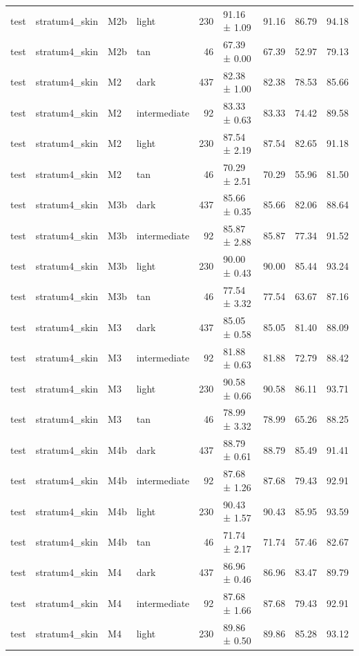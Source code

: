 \begin{tabular}{llllrlrrr}
test & stratum4\_skin & M2b & light & 230 & 91.16 ± 1.09 & 91.16 & 86.79 & 94.18 \\
test & stratum4\_skin & M2b & tan & 46 & 67.39 ± 0.00 & 67.39 & 52.97 & 79.13 \\
test & stratum4\_skin & M2 & dark & 437 & 82.38 ± 1.00 & 82.38 & 78.53 & 85.66 \\
test & stratum4\_skin & M2 & intermediate & 92 & 83.33 ± 0.63 & 83.33 & 74.42 & 89.58 \\
test & stratum4\_skin & M2 & light & 230 & 87.54 ± 2.19 & 87.54 & 82.65 & 91.18 \\
test & stratum4\_skin & M2 & tan & 46 & 70.29 ± 2.51 & 70.29 & 55.96 & 81.50 \\
test & stratum4\_skin & M3b & dark & 437 & 85.66 ± 0.35 & 85.66 & 82.06 & 88.64 \\
test & stratum4\_skin & M3b & intermediate & 92 & 85.87 ± 2.88 & 85.87 & 77.34 & 91.52 \\
test & stratum4\_skin & M3b & light & 230 & 90.00 ± 0.43 & 90.00 & 85.44 & 93.24 \\
test & stratum4\_skin & M3b & tan & 46 & 77.54 ± 3.32 & 77.54 & 63.67 & 87.16 \\
test & stratum4\_skin & M3 & dark & 437 & 85.05 ± 0.58 & 85.05 & 81.40 & 88.09 \\
test & stratum4\_skin & M3 & intermediate & 92 & 81.88 ± 0.63 & 81.88 & 72.79 & 88.42 \\
test & stratum4\_skin & M3 & light & 230 & 90.58 ± 0.66 & 90.58 & 86.11 & 93.71 \\
test & stratum4\_skin & M3 & tan & 46 & 78.99 ± 3.32 & 78.99 & 65.26 & 88.25 \\
test & stratum4\_skin & M4b & dark & 437 & 88.79 ± 0.61 & 88.79 & 85.49 & 91.41 \\
test & stratum4\_skin & M4b & intermediate & 92 & 87.68 ± 1.26 & 87.68 & 79.43 & 92.91 \\
test & stratum4\_skin & M4b & light & 230 & 90.43 ± 1.57 & 90.43 & 85.95 & 93.59 \\
test & stratum4\_skin & M4b & tan & 46 & 71.74 ± 2.17 & 71.74 & 57.46 & 82.67 \\
test & stratum4\_skin & M4 & dark & 437 & 86.96 ± 0.46 & 86.96 & 83.47 & 89.79 \\
test & stratum4\_skin & M4 & intermediate & 92 & 87.68 ± 1.66 & 87.68 & 79.43 & 92.91 \\
test & stratum4\_skin & M4 & light & 230 & 89.86 ± 0.50 & 89.86 & 85.28 & 93.12 \\

\end{tabular}
